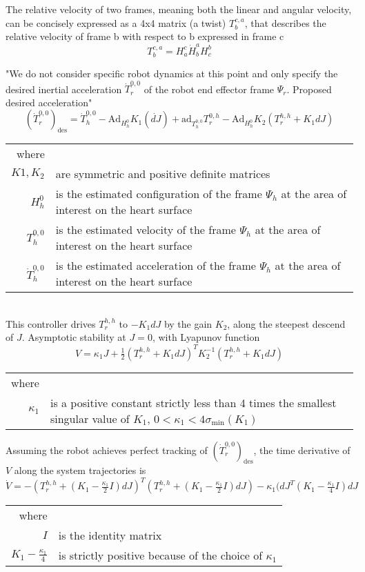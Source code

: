The relative velocity of two frames, meaning both the linear and angular velocity, can be concisely expressed as a 4x4 matrix (a twist) $T^{c,a}_b$, that describes the relative velocity of frame b with respect to b expressed in frame c
\begin{equation}
T^{c,a}_b = H^c_a \dot{H}^a_b H^b_c
\end{equation}

"We do not consider specific robot dynamics at this point and only specify the desired inertial acceleration $\dot{T}^{0,0}_r$ of the robot end effector frame $\Psi_r$. Proposed desired acceleration"
\begin{equation}
\left(\dot{T}^{0,0}_r\right)_\text{des} = \dot{T}^{0,0}_h - \text{Ad}_{H^0_h} K_1 (\dot{dJ}) + \text{ad}_{T^{0,0}_h} T^{0,h}_r - \text{Ad}_{H^0_h} K_2 (T^{h,h}_r + K_1 dJ)
\end{equation}
\begin{tabular}{rl}
	where & \\
	$K1, K_2$ & are symmetric and positive definite matrices\\
	$H^0_h$ & is the estimated configuration of the frame $\Psi_h$ at the area of interest on the heart surface\\
	$T^{0,0}_h$ & is the estimated velocity of the frame $\Psi_h$ at the area of interest on the heart surface\\
	$\dot{T}^{0,0}_h$ & is the estimated acceleration of the frame $\Psi_h$ at the area of interest on the heart surface\\
\end{tabular}\\

This controller drives $T^{h,h}_r$ to $-K_1dJ$ by the gain $K_2$, along the steepest descend of $J$. Asymptotic stability at $J=0$, with Lyapunov function
\begin{equation}
V=\kappa_1 J + \tfrac{1}{2} (T^{h,h}_r + K_1dJ)^T K_2^{-1}(T^{h,h}_r + K_1dJ)
\end{equation}
\begin{tabular}{rl}
	where & \\
	$\kappa_1$ & is a positive constant strictly less than 4 times the smallest singular value of $K_1$, $0<\kappa_1 <4\sigma_\text{min}(K_1)$
\end{tabular}

Assuming the robot achieves perfect tracking of $\left(\dot{T}^{0,0}_r\right)_\text{des}$, the time derivative of $V$ along the system trajectories is
\begin{equation}
\dot{V} = -\left(T^{h,h}_r + (K_1 - \tfrac{\kappa_1}{2}I)dJ\right)^T \left(T^{h,h}_r + (K_1 - \tfrac{\kappa_1}{2}I)dJ\right) - \kappa_1(dJ ^T(K_1 - \tfrac{\kappa_1}{4}I)dJ
\end{equation}
\begin{tabular}{rl}
	where & \\
	$I$ & is the identity matrix\\
	$K_1 - \tfrac{\kappa_1}{4}$ & is strictly positive because of the choice of $\kappa_1$\\
\end{tabular}